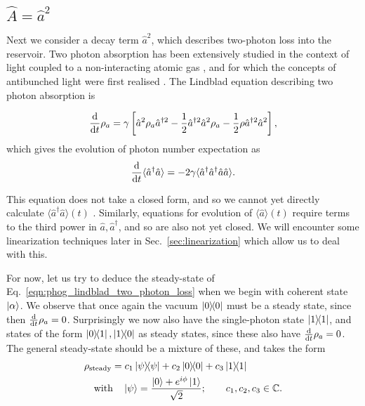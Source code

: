 \FloatBarrier
\subsection{$\hat{A} = \hat{a}^2$}\label{sec:A_aa}
Next we consider a decay term $\hat{a}^2$, which describes two-photon loss into the reservoir. Two photon absorption has been extensively studied in the context of light coupled to a non-interacting atomic gas \cite{Shen1967, Loudon1980, Simaan1975, Simaan1978}, and for which the concepts of antibunched light were first realised \cite{Mandel1979}. The Lindblad equation describing two photon absorption is

\begin{equation}\label{eqn:phog_lindblad_two_photon_loss}
\frac{\mathrm{d}}{\mathrm{d}t} \rho_a = \gamma\left[\hat{a}^2 \rho_a \hat{a}^{\dagger 2} - \frac{1}{2} \hat{a}^{\dagger 2} \hat{a}^2 \rho_a - \frac{1}{2} \rho \hat{a}^{\dagger 2} \hat{a}^2\right],
\end{equation}
which gives the evolution of photon number expectation as 
\begin{equation}\label{eqn:aa_not_closed}
\frac{\mathrm{d}}{\mathrm{d}t} \langle \hat{a}^\dagger \hat{a}\rangle = - 2 \gamma \langle \hat{a}^\dagger \hat{a}^\dagger \hat{a}\hat{a}\rangle.
\end{equation}

\noindent This equation does not take a closed form, and so we cannot yet directly calculate $\langle \hat{a}^\dagger \hat{a}\rangle\left(t\right)$ \cite{Shen1967}. Similarly, equations for evolution of $\langle\hat{a}\rangle\left(t\right)$ require terms to the third power in $\hat{a}, \hat{a}^\dagger$, and so are also not yet closed.  We will encounter some linearization techniques later in Sec.~\ref{sec:linearization} which allow us to deal with this.

For now, let us try to deduce the steady-state of Eq.~\ref{eqn:phog_lindblad_two_photon_loss} when we begin with coherent state $\ket{\alpha}$. We observe that once again the vacuum $\dyad{0}$ must be a steady state, since then $\frac{\mathrm{d}}{\mathrm{d}t} \rho_a=0$. Surprisingly we now also have the single-photon state $\dyad{1}$, and states of the form $\dyad{0}{1}, \dyad{1}{0}$ as steady states, since these also have $\frac{\mathrm{d}}{\mathrm{d}t} \rho_a=0$. The general steady-state should be a mixture of these, and takes the form
\begin{align}\label{eqn:phog_phase_state}
&\rho_{\text{steady}} = c_1 \dyad{\psi} + c_2 \dyad{0} + c_3 \dyad{1} \notag \\
%
&\qq{with} \ket{\psi} = \frac{\ket{0} + e^{i \phi} \ket{1}}{\sqrt{2}};  \qq{} c_1, c_2, c_3 \in \mathbb{C}.
\end{align}

